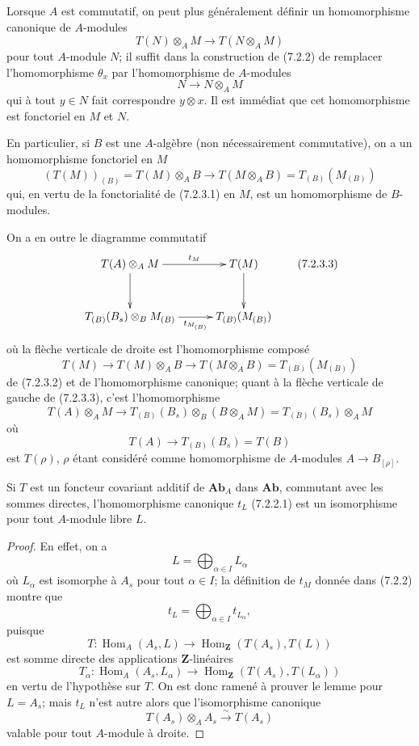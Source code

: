 \begin{env}[7.2.3]
Lorsque $A$ est commutatif, on peut plus généralement définir un
homomorphisme canonique de $A$-modules
\[
  T(N)\otimes_A M\longrightarrow T(N\otimes_A M)
  \tag{7.2.3.1}\label{III.7.2.3.1.fr}
\]
pour tout $A$-module $N$; il suffit dans la construction de (7.2.2) de
remplacer l'homomorphisme $\theta_x$ par l'homomorphisme de $A$-modules
\[
  N\longrightarrow N\otimes_A M
\]
qui à tout $y\in N$ fait correspondre $y\otimes x$. Il est immédiat que cet
homomorphisme est fonctoriel en $M$ et $N$.

En particulier, si $B$ est une $A$-algèbre (non nécessairement commutative),
on a un homomorphisme fonctoriel en $M$
\[
  (T(M))_{(B)}
  =
  T(M)\otimes_A B
  \longrightarrow
  T(M\otimes_A B)
  =
  T_{(B)}(M_{(B)})
  \tag{7.2.3.2}\label{III.7.2.3.2.fr}
\]
qui, en vertu de la fonctorialité de (7.2.3.1) en $M$, est un homomorphisme
de $B$-modules.

On a en outre le diagramme commutatif
\[
\xymatrix@C=30pt@R=30pt{
  T(A)\otimes_A M
  \ar[r]^-{t_M}\ar[d]
  &
  T(M)\ar[d]
  \\
  T_{(B)}(B_s)\otimes_B M_{(B)}
  \ar[r]_-{t_{M_{(B)}}}
  &
  T_{(B)}(M_{(B)})
}
\tag{7.2.3.3}\label{III.7.2.3.3.fr}
\]
où la flèche verticale de droite est l'homomorphisme composé
\[
  T(M)
  \longrightarrow
  T(M)\otimes_A B
  \longrightarrow
  T(M\otimes_A B)
  =
  T_{(B)}(M_{(B)})
\]
de (7.2.3.2) et de l'homomorphisme canonique; quant à la flèche verticale de
gauche de (7.2.3.3), c'est l'homomorphisme
\[
  T(A)\otimes_A M
  \longrightarrow
  T_{(B)}(B_s)\otimes_B(B\otimes_A M)
  =
  T_{(B)}(B_s)\otimes_A M
\]
où
\[
  T(A)\longrightarrow T_{(B)}(B_s)=T(B)
\]
est $T(\rho)$, $\rho$ étant considéré comme homomorphisme de $A$-modules
$A\to B_{[\rho]}$.
\end{env}

\begin{lemma}[7.2.4]
Si $T$ est un foncteur covariant additif de $\mathbf{Ab}_A$ dans
$\mathbf{Ab}$, commutant avec les sommes directes, l'homomorphisme canonique
$t_L$ (7.2.2.1) est un isomorphisme pour tout $A$-module libre $L$.
\end{lemma}

\begin{proof}
En effet, on a
\[
  L=\bigoplus_{\alpha\in I}L_\alpha
\]
où $L_\alpha$ est isomorphe à $A_s$ pour tout $\alpha\in I$; la définition de
$t_M$ donnée dans (7.2.2) montre que
\[
  t_L=\bigoplus_{\alpha\in I}t_{L_\alpha},
\]
puisque
\[
  T:
  \operatorname{Hom}_A(A_s,L)
  \longrightarrow
  \operatorname{Hom}_{\mathbf Z}(T(A_s),T(L))
\]
est somme directe des applications $\mathbf Z$-linéaires
\[
  T_\alpha:
  \operatorname{Hom}_A(A_s,L_\alpha)
  \longrightarrow
  \operatorname{Hom}_{\mathbf Z}(T(A_s),T(L_\alpha))
\]
en vertu de l'hypothèse sur $T$. On est donc ramené à prouver le lemme pour
$L=A_s$; mais $t_L$ n'est autre alors que l'isomorphisme canonique
\[
  T(A_s)\otimes_A A_s\xrightarrow{\sim}T(A_s)
\]
valable pour tout $A$-module à droite.
\end{proof}

